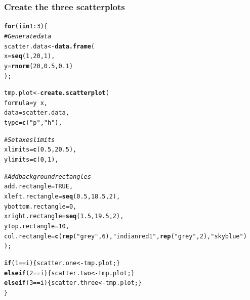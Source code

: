 \documentclass[letterpaper]{article}\usepackage[]{graphicx}\usepackage[]{color}
\makeatletter
\newcommand{\hlnum}[1]{\textcolor[rgb]{0.686,0.059,0.569}{#1}}%
\newcommand{\hlstr}[1]{\textcolor[rgb]{0.192,0.494,0.8}{#1}}%
\newcommand{\hlcom}[1]{\textcolor[rgb]{0.678,0.584,0.686}{\textit{#1}}}%
\newcommand{\hlopt}[1]{\textcolor[rgb]{0,0,0}{#1}}%
\newcommand{\hlstd}[1]{\textcolor[rgb]{0.345,0.345,0.345}{#1}}%
\newcommand{\hlkwa}[1]{\textcolor[rgb]{0.161,0.373,0.58}{\textbf{#1}}}%
\newcommand{\hlkwb}[1]{\textcolor[rgb]{0.69,0.353,0.396}{#1}}%
\newcommand{\hlkwc}[1]{\textcolor[rgb]{0.333,0.667,0.333}{#1}}%
\newcommand{\hlkwd}[1]{\textcolor[rgb]{0.737,0.353,0.396}{\textbf{#1}}}%
\newenvironment{kframe}{%
 \def\at@end@of@kframe{}%
 \ifinner\ifhmode%
  \def\at@end@of@kframe{\end{minipage}}%
  \begin{minipage}{\columnwidth}%
 \fi\fi%
 \def\FrameCommand##1{\hskip\@totalleftmargin \hskip-\fboxsep
 \colorbox{shadecolor}{##1}\hskip-\fboxsep
     \hskip-\linewidth \hskip-\@totalleftmargin \hskip\columnwidth}%
 \MakeFramed {\advance\hsize-\width
   \@totalleftmargin\z@ \linewidth\hsize
   \@setminipage}}%
 {\par\unskip\endMakeFramed%
 \at@end@of@kframe}
\newenvironment{knitrout}{}{} %
\makeatother
\begin{document}
\subsubsection{Create the three scatterplots}
\begin{knitrout}
\color{fgcolor}\begin{kframe}
\begin{alltt}
\hlkwa{for}\hlstd{(i} \hlkwa{in} \hlnum{1}\hlopt{:}\hlnum{3}\hlstd{)\{}
   \hlcom{# Generate data}
        \hlstd{scatter.data} \hlkwb{<-} \hlkwd{data.frame}\hlstd{(}
                \hlkwc{x} \hlstd{=} \hlkwd{seq}\hlstd{(}\hlnum{1}\hlstd{,} \hlnum{20}\hlstd{,} \hlnum{1}\hlstd{),}
                \hlkwc{y} \hlstd{=} \hlkwd{rnorm}\hlstd{(}\hlnum{20}\hlstd{,} \hlnum{0.5}\hlstd{,} \hlnum{0.1}\hlstd{)}
                \hlstd{);}

        \hlstd{tmp.plot} \hlkwb{<-} \hlkwd{create.scatterplot}\hlstd{(}
                \hlkwc{formula} \hlstd{= y} \hlopt{~} \hlstd{x,}
                \hlkwc{data} \hlstd{= scatter.data,}
                \hlkwc{type} \hlstd{=} \hlkwd{c}\hlstd{(}\hlstr{"p"}\hlstd{,} \hlstr{"h"}\hlstd{),}

                \hlcom{# Set axes limits}
                \hlkwc{xlimits} \hlstd{=} \hlkwd{c}\hlstd{(}\hlnum{0.5}\hlstd{,} \hlnum{20.5}\hlstd{),}
                \hlkwc{ylimits} \hlstd{=} \hlkwd{c}\hlstd{(}\hlnum{0}\hlstd{,}\hlnum{1}\hlstd{),}

                \hlcom{# Add background rectangles}
                \hlkwc{add.rectangle} \hlstd{=} \hlnum{TRUE}\hlstd{,}
                \hlkwc{xleft.rectangle} \hlstd{=} \hlkwd{seq}\hlstd{(}\hlnum{0.5}\hlstd{,} \hlnum{18.5}\hlstd{,} \hlnum{2}\hlstd{),}
                \hlkwc{ybottom.rectangle} \hlstd{=} \hlnum{0}\hlstd{,}
                \hlkwc{xright.rectangle} \hlstd{=} \hlkwd{seq}\hlstd{(}\hlnum{1.5}\hlstd{,} \hlnum{19.5}\hlstd{,} \hlnum{2}\hlstd{),}
                \hlkwc{ytop.rectangle} \hlstd{=} \hlnum{10}\hlstd{,}
                \hlkwc{col.rectangle} \hlstd{=} \hlkwd{c}\hlstd{(}\hlkwd{rep}\hlstd{(}\hlstr{"grey"}\hlstd{,} \hlnum{6}\hlstd{),} \hlstr{"indianred1"}\hlstd{,} \hlkwd{rep}\hlstd{(}\hlstr{"grey"}\hlstd{,} \hlnum{2}\hlstd{),} \hlstr{"skyblue"}\hlstd{)}
                \hlstd{);}

        \hlkwa{if} \hlstd{(}\hlnum{1} \hlopt{==} \hlstd{i) \{ scatter.one} \hlkwb{<-} \hlstd{tmp.plot; \}}
        \hlkwa{else if} \hlstd{(}\hlnum{2} \hlopt{==} \hlstd{i) \{ scatter.two} \hlkwb{<-} \hlstd{tmp.plot; \}}
        \hlkwa{else if} \hlstd{(}\hlnum{3} \hlopt{==} \hlstd{i) \{ scatter.three} \hlkwb{<-} \hlstd{tmp.plot; \}}
\hlstd{\}}


\end{alltt}
\end{kframe}
\end{knitrout}
\end{document}
